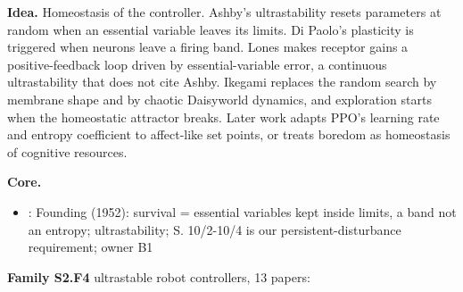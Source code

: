 \documentclass[10pt]{article}
\newcommand{\memb}[1]{\par\smallskip\textbf{#1}\quad}
\begin{document}
\textbf{Idea.} Homeostasis of the controller. Ashby's ultrastability resets parameters at random when an essential variable leaves its limits. Di Paolo's plasticity is triggered when neurons leave a firing band. Lones makes receptor gains a positive-feedback loop driven by essential-variable error, a continuous ultrastability that does not cite Ashby. Ikegami replaces the random search by membrane shape and by chaotic Daisyworld dynamics, and exploration starts when the homeostatic attractor breaks. Later work adapts PPO's learning rate and entropy coefficient to affect-like set points, or treats boredom as homeostasis of cognitive resources.

\memb{Core.}
\begin{itemize}[nosep,leftmargin=1.2em]
\item \citet{Ashby-design52}: Founding (1952): survival = essential variables kept inside limits, a band not an entropy; ultrastability; S. 10/2-10/4 is our persistent-disturbance requirement; owner B1
\end{itemize}
\memb{Family S2.F4} ultrastable robot controllers, 13 papers: {\footnotesize \citetext{\citealp{Ashby-design52}; \citealp{DiPaolo-homeostatic00}; \citealp{DiPaolo-organismically03}; \citealp{Iizuka-extended08}\dag; \citealp{Ikegami-homeostatic08}; \citealp{Egbert-habit14}\dag; \citealp{Lones-hormone18}; \citealp{Man-need22}; \citealp{Pitonakova-ultrastable12}; \citealp{Franchi-homeostats13}\dag; \citealp{Izquierdo-analysis13}; \citealp{Battle-ashbys14}; \citealp{Man-truth20}}}
\end{document}
